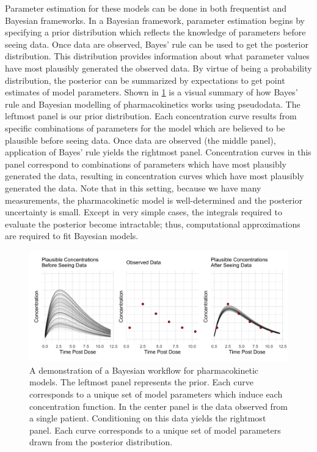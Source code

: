Parameter estimation for these models can be done in both frequentist and Bayesian frameworks.  In a Bayesian framework, parameter estimation begins by specifying a prior distribution which reflects the knowledge of parameters before seeing data. Once data are observed, Bayes’ rule can be used to get the posterior distribution.  This distribution provides information about what parameter values have most plausibly generated the observed data.  By virtue of being a probability distribution, the posterior can be summarized by expectations to get point estimates of model parameters. Shown in \cref{fig:fig1} is a visual summary of how Bayes’ rule and Bayesian modelling of pharmacokinetics works using pseudodata. The leftmost panel is our prior distribution.  Each concentration curve results from specific combinations of parameters for the model which are believed to be plausible before seeing data.  Once data are observed (the middle panel), application of Bayes’ rule yields the rightmost panel.  Concentration curves in this panel correspond to combinations of parameters which have most plausibly generated the data, resulting in concentration curves which have most plausibly generated the data. Note that in this setting, because we have many measurements, the pharmacokinetic model is well-determined and the posterior uncertainty is small. Except in very simple cases, the integrals required to evaluate the posterior become intractable; thus, computational approximations are required to fit Bayesian models.
%
\begin{figure} [h!]
	\centering
	\includegraphics[width=\linewidth]{figures/fig_1}
	\caption{A demonstration of a Bayesian workflow for pharmacokinetic models.  The leftmost panel represents the prior.  Each curve corresponds to a unique set of model parameters which induce each concentration function.  In the center panel is the data observed from a single patient.  Conditioning on this data yields the rightmost panel.  Each curve corresponds to a unique set of model parameters drawn from the posterior distribution.} 
	\label{fig:fig1}
\end{figure}
%
